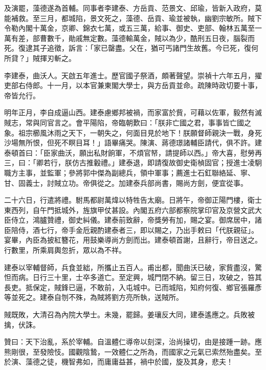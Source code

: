 \begin{pinyinscope}
及演罷，藻德遂為首輔。同事者李建泰、方岳貢、范景文、邱瑜，皆新入政府，莫能補救。至三月，都城陷，景文死之，藻德、岳貢、瑜並被執，幽劉宗敏所。賊下令勒內閣十萬金，京卿、錦衣七萬，或五三萬，給事、御史、吏部、翰林五萬至一萬有差，部曹數千，勛戚無定數。藻德輸萬金，賊以為少，酷刑五日夜，腦裂而死。復逮其子追徵，訴言：「家已罄盡。父在，猶可丐諸門生故舊。今已死，復何所貸？」賊揮刃斬之。

李建泰，曲沃人。天啟五年進士。歷官國子祭酒，頗著聲望。崇禎十六年五月，擢吏部右侍郎。十一月，以本官兼東閣大學士，與方岳貢並命。疏陳時政切要十事，帝皆允行。

明年正月，李自成逼山西。建泰慮鄉邦被禍，而家富於貲，可藉以佐軍，毅然有滅賊志，常與同官言之。會平陽陷，帝臨朝歎曰：「朕非亡國之君，事事皆亡國之象。祖宗櫛風沐雨之天下，一朝失之，何面目見於地下！朕願督師親決一戰，身死沙場無所恨，但死不瞑目耳！」語畢痛哭。陳演、蔣德璟諸輔臣請代，俱不許。建泰頓首曰：「臣家曲沃，願出私財餉軍，不煩官帑，請提師以西。」帝大喜，慰勞再三，曰：「卿若行，朕仿古推轂禮。」建泰退，即請復故御史衛楨固官；授進士凌駉職方主事，並監軍；參將郭中傑為副總兵，領中軍事；薦進士石釭聯絡延、寧、甘、固義士，討賊立功。帝俱從之。加建泰兵部尚書，賜尚方劍，便宜從事。

二十六日，行遣將禮。駙馬都尉萬煒以特牲告太廟。日將午，帝御正陽門樓，衛士東西列，自午門抵城外，旌旗甲仗甚設。內閣五府六部都察院掌印官及京營文武大臣侍立，鴻臚贊禮，御史糾儀。建泰前致辭，帝獎勞有加，賜之宴。御席居中，諸臣陪侍，酒七行，帝手金卮親酌建泰者三，即以賜之，乃出手敕曰「代朕親征」。宴畢，內臣為披紅簪花，用鼓樂導尚方劍而出。建泰頓首謝，且辭行，帝目送之。行數里，所乘肩輿忽折，眾以為不祥。

建泰以宰輔督師，兵食並絀，所攜止五百人。甫出都，聞曲沃已破，家貲盡沒，驚怛而病。日行三十里，士卒多道亡。至定興，城門閉不納。留三日，攻破之，笞其長吏。抵保定，賊鋒已逼，不敢前，入屯城中。已而城陷，知府何復、鄉官張羅彥等並死之。建泰自刎不殊，為賊將劉方亮所執，送賊所。

賊既敗，大清召為內院大學士。未幾，罷歸。姜瓖反大同，建泰遙應之。兵敗被擒，伏誅。

贊曰：天下治亂，系於宰輔。自溫體仁導帝以刻深，治尚操切，由是接踵一跡。應熊剛很，至發險忮。國觀陰鷙，一效體仁之所為，而國家之元氣已索然殆盡矣。至於演、藻德之徒，機智弗如，而庸庸益甚，禍中於國，旋及其身，悲夫！


\end{pinyinscope}
